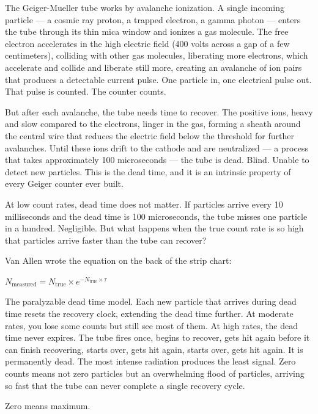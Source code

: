 \documentclass[12pt, letterpaper]{article}
\begin{document}
The Geiger-Mueller tube works by avalanche ionization. A single incoming particle --- a cosmic ray proton, a trapped electron, a gamma photon --- enters the tube through its thin mica window and ionizes a gas molecule. The free electron accelerates in the high electric field (400 volts across a gap of a few centimeters), colliding with other gas molecules, liberating more electrons, which accelerate and collide and liberate still more, creating an avalanche of ion pairs that produces a detectable current pulse. One particle in, one electrical pulse out. That pulse is counted. The counter counts.

But after each avalanche, the tube needs time to recover. The positive ions, heavy and slow compared to the electrons, linger in the gas, forming a sheath around the central wire that reduces the electric field below the threshold for further avalanches. Until these ions drift to the cathode and are neutralized --- a process that takes approximately 100 microseconds --- the tube is dead. Blind. Unable to detect new particles. This is the dead time, and it is an intrinsic property of every Geiger counter ever built.

At low count rates, dead time does not matter. If particles arrive every 10 milliseconds and the dead time is 100 microseconds, the tube misses one particle in a hundred. Negligible. But what happens when the true count rate is so high that particles arrive faster than the tube can recover?

Van Allen wrote the equation on the back of the strip chart:

\begin{center}
$N_{\text{measured}} = N_{\text{true}} \times e^{-N_{\text{true}} \times \tau}$
\end{center}

The paralyzable dead time model. Each new particle that arrives during dead time resets the recovery clock, extending the dead time further. At moderate rates, you lose some counts but still see most of them. At high rates, the dead time never expires. The tube fires once, begins to recover, gets hit again before it can finish recovering, starts over, gets hit again, starts over, gets hit again. It is permanently dead. The most intense radiation produces the least signal. Zero counts means not zero particles but an overwhelming flood of particles, arriving so fast that the tube can never complete a single recovery cycle.

Zero means maximum.
\end{document}
